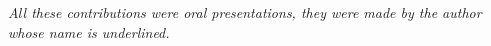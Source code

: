 \documentclass[11pt,a4paper]{moderncv}
\newcommand\ago[1]{\textcolor{reddark}{#1}}
\begin{document}
 



 
 


\textit{All these contributions were oral presentations, they were made by the author whose name is underlined.}
\end{document}
